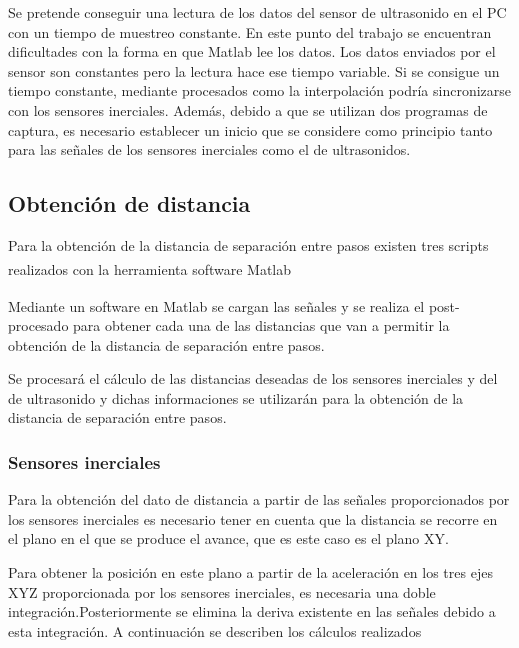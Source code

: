 Se pretende conseguir una lectura de los datos del sensor de ultrasonido en el PC con un tiempo de muestreo constante. En este punto del trabajo se encuentran dificultades con la forma en que Matlab lee los datos. Los datos enviados por el sensor son constantes pero la lectura hace ese tiempo variable. Si se consigue un tiempo constante, mediante procesados como la interpolación podría sincronizarse con los sensores inerciales. Además, debido a que se utilizan dos programas de captura, es necesario establecer un inicio que se considere como principio tanto para las señales de los sensores inerciales como el de ultrasonidos. 


\subsection{Obtención de distancia}
Para la obtención de la distancia de separación entre pasos existen tres scripts realizados con la herramienta software Matlab\textsuperscript{\textregistered}

Mediante un software en Matlab\textsuperscript{\textregistered} se cargan las señales y se realiza el post-procesado para obtener cada una de las distancias que van a permitir la obtención de la distancia de separación entre pasos.

Se procesará el cálculo de las distancias deseadas de los sensores inerciales y del de ultrasonido y dichas informaciones se utilizarán para la obtención de la distancia de separación entre pasos.

\subsubsection{Sensores inerciales}

	
	Para la obtención del dato de distancia a partir de las señales proporcionados por los sensores inerciales es necesario tener en cuenta que la distancia se recorre en el plano en el que se produce el avance, que es este caso es el plano XY.

Para obtener la posición en este plano a partir de la aceleración en los tres ejes XYZ proporcionada por los sensores inerciales, es necesaria una doble integración.Posteriormente se elimina la deriva existente en las señales debido a esta integración. A continuación se describen los cálculos realizados

